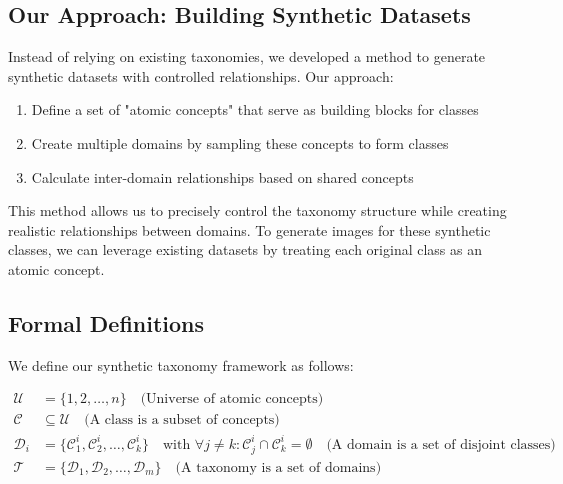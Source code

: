 \subsection{Our Approach: Building Synthetic Datasets}

Instead of relying on existing taxonomies, we developed a method to generate synthetic datasets with controlled relationships. Our approach:

\begin{enumerate}
    \item Define a set of "atomic concepts" that serve as building blocks for classes
    \item Create multiple domains by sampling these concepts to form classes
    \item Calculate inter-domain relationships based on shared concepts
\end{enumerate}

This method allows us to precisely control the taxonomy structure while creating realistic relationships between domains. To generate images for these synthetic classes, we can leverage existing datasets by treating each original class as an atomic concept.

\subsection{Formal Definitions}

We define our synthetic taxonomy framework as follows:

\begin{equation}
    \begin{aligned}
        \mathcal{U}   & = \{1, 2, \ldots, n\} \quad \text{(Universe of atomic concepts)}                                                                                                                                           \\
        \mathcal{C}   & \subseteq \mathcal{U} \quad \text{(A class is a subset of concepts)}                                                                                                                                       \\
        \mathcal{D}_i & = \{\mathcal{C}_1^i, \mathcal{C}_2^i, \ldots, \mathcal{C}_k^i\} \quad \text{with } \forall j \neq k: \mathcal{C}_j^i \cap \mathcal{C}_k^i = \emptyset \quad \text{(A domain is a set of disjoint classes)} \\
        \mathcal{T}   & = \{\mathcal{D}_1, \mathcal{D}_2, \ldots, \mathcal{D}_m\} \quad \text{(A taxonomy is a set of domains)}
    \end{aligned}
\end{equation}

